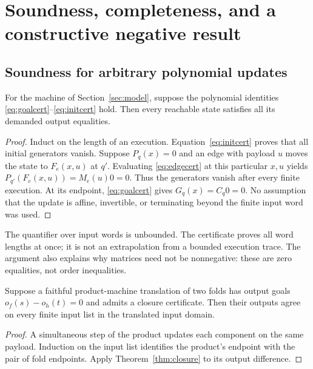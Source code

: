 \section{Soundness, completeness, and a constructive negative result}
\label{sec:theory}

\subsection{Soundness for arbitrary polynomial updates}
\begin{theorem}\label{thm:closure}
For the machine of Section~\ref{sec:model}, suppose the polynomial identities
\eqref{eq:goalcert}--\eqref{eq:initcert} hold. Then every reachable state
satisfies all its demanded output equalities.
\end{theorem}
\begin{proof}
Induct on the length of an execution. Equation~\eqref{eq:initcert} proves that
all initial generators vanish. Suppose $P_q(x)=0$ and an edge with payload $u$
moves the state to $F_e(x,u)$ at $q'$. Evaluating
\eqref{eq:edgecert} at this particular $x,u$ yields
$P_{q'}(F_e(x,u))=M_e(u)0=0$. Thus the generators vanish after every finite
execution. At its endpoint, \eqref{eq:goalcert} gives $G_q(x)=C_q0=0$.
No assumption that the update is affine, invertible, or terminating beyond the
finite input word was used.
\end{proof}

The quantifier over input words is unbounded. The certificate proves all word
lengths at once; it is not an extrapolation from a bounded execution trace.
The argument also explains why matrices need not be nonnegative: these are
zero equalities, not order inequalities.

\begin{corollary}
Suppose a faithful product-machine translation of two folds has output goals
$o_f(s)-o_h(t)=0$ and admits a closure certificate. Then their outputs agree
on every finite input list in the translated input domain.
\end{corollary}
\begin{proof}
A simultaneous step of the product updates each component on the same payload.
Induction on the input list identifies the product's endpoint with the pair of
fold endpoints. Apply Theorem~\ref{thm:closure} to its output difference.
\end{proof}

